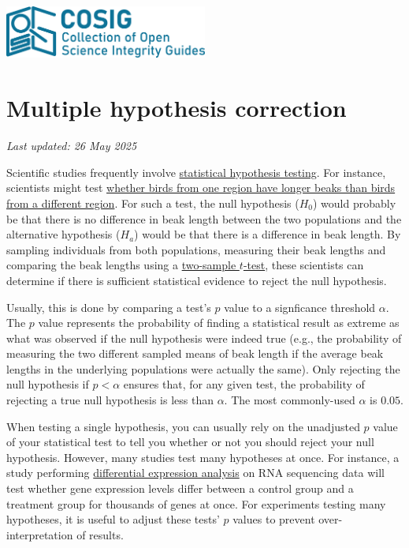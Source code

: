 \documentclass[letterpaper, 12pt]{article}
\begin{document}
\flushleft
\includegraphics[width=0.5\textwidth]{img/home/241017_final_logo_mockup.png}

\section*{Multiple hypothesis correction}
\textit{Last updated: 26 May 2025}

Scientific studies frequently involve \href{https://www.britannica.com/science/statistics/Hypothesis-testing}{statistical hypothesis testing}. For instance, scientists might test \href{https://doi.org/10.1038/s41598-023-49623-y}{whether birds from one region have longer beaks than birds from a different region}. For such a test, the null hypothesis ($H_0$) would probably be that there is no difference in beak length between the two populations and the alternative hypothesis ($H_a$) would be that there is a difference in beak length. By sampling individuals from both populations, measuring their beak lengths and comparing the beak lengths using a \href{https://en.wikipedia.org/wiki/Student%27s_t-test}{two-sample $t$-test}, these scientists can determine if there is sufficient statistical evidence to reject the null hypothesis. 

Usually, this is done by comparing a test's $p$ value to a signficance threshold $\alpha$. The $p$ value represents the probability of finding a statistical result as extreme as what was observed if the null hypothesis were indeed true (e.g., the probability of measuring the two different sampled means of beak length if the average beak lengths in the underlying populations were actually the same). Only rejecting the null hypothesis if $p < \alpha$ ensures that, for any given test, the probability of rejecting a true null hypothesis is less than $\alpha$. The most commonly-used $\alpha$ is $0.05$.

When testing a single hypothesis, you can usually rely on the unadjusted $p$ value of your statistical test to tell you whether or not you should reject your null hypothesis. However, many studies test many hypotheses at once. For instance, a study performing \href{https://www.ebi.ac.uk/training/online/courses/functional-genomics-ii-common-technologies-and-data-analysis-methods/rna-sequencing/performing-a-rna-seq-experiment/data-analysis/differential-gene-expression-analysis/#:~:text=Differential%20expression%20analysis%20means%20taking,expression%20levels%20between%20experimental%20groups}{differential expression analysis} on RNA sequencing data will test whether gene expression levels differ between a control group and a treatment group for thousands of genes at once. For experiments testing many hypotheses, it is useful to adjust these tests' $p$ values to prevent over-interpretation of results.
\end{document}
